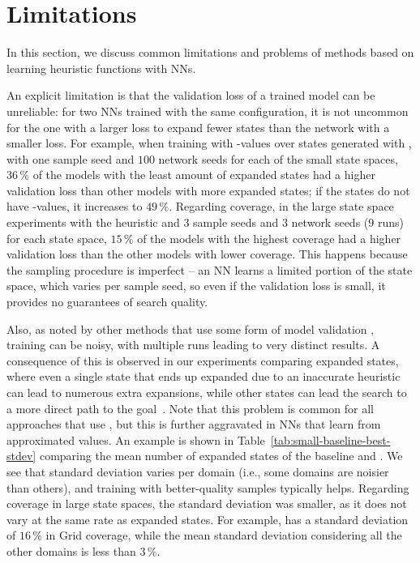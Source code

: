 \chapter{Limitations}
\label{sec:limitations}

In this section, we discuss common limitations and problems of methods based on learning heuristic functions with NNs.

An explicit limitation is that the validation loss of a trained model can be unreliable: for two NNs trained with the same configuration, it is not uncommon for the one with a larger loss to expand fewer states than the network with a smaller loss. For example, when training with \hstar-values over states generated with \bfsrw, with one sample seed and $100$ network seeds for each of the small state spaces, $36\,\%$ of the models with the least amount of expanded states had a higher validation loss than other models with more expanded states; if the states do not have \hstar-values, it increases to $49\,\%$. Regarding coverage, in the large state space experiments with the heuristic \hnnrs and $3$ sample seeds and $3$ network seeds ($9$ runs) for each state space, $15\,\%$ of the models with the highest coverage had a higher validation loss than the other models with lower coverage. This happens because the sampling procedure is imperfect -- an NN learns a limited portion of the state space, which varies per sample seed, so even if the validation loss is small, it provides no guarantees of search quality.

Also, as noted by other methods that use some form of model validation \cite{Ferber.etal/2020a, Shen.etal/2020, Ferber.etal/2022, OToole/2022}, training can be noisy, with multiple runs leading to very distinct results. A consequence of this is observed in our experiments comparing expanded states, where even a single state that ends up expanded due to an inaccurate heuristic can lead to numerous extra expansions, while other states can lead the search to a more direct path to the goal~\cite{Heusner.etal/2017}. Note that this problem is common for all approaches that use \gbfs, but this is further aggravated in NNs that learn from approximated values.
An example is shown in Table~\ref{tab:small-baseline-best-stdev} comparing the mean number of expanded states of the baseline and \hnnrs. We see that standard deviation varies per domain (i.e., some domains are noisier than others), and training with better-quality samples typically helps. Regarding coverage in large state spaces, the standard deviation was smaller, as it does not vary at the same rate as expanded states. For example, \hnnrs has a standard deviation of $16\,\%$ in Grid coverage, while the mean standard deviation considering all the other domains is less than $3\,\%$.

